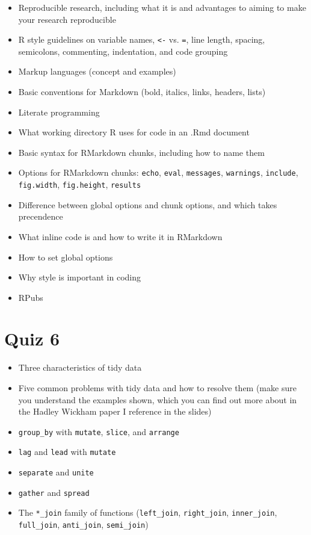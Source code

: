 \documentclass[]{book}
\providecommand{\tightlist}{%
  \setlength{\itemsep}{0pt}\setlength{\parskip}{0pt}}
\theoremstyle{definition}
\theoremstyle{definition}
\theoremstyle{definition}
\theoremstyle{remark}
\begin{document}
\begin{itemize}
\tightlist
\item
  Reproducible research, including what it is and advantages to aiming
  to make your research reproducible
\item
  R style guidelines on variable names, \texttt{\textless{}-} vs.
  \texttt{=}, line length, spacing, semicolons, commenting, indentation,
  and code grouping
\item
  Markup languages (concept and examples)
\item
  Basic conventions for Markdown (bold, italics, links, headers, lists)
\item
  Literate programming
\item
  What working directory R uses for code in an .Rmd document
\item
  Basic syntax for RMarkdown chunks, including how to name them
\item
  Options for RMarkdown chunks: \texttt{echo}, \texttt{eval},
  \texttt{messages}, \texttt{warnings}, \texttt{include},
  \texttt{fig.width}, \texttt{fig.height}, \texttt{results}
\item
  Difference between global options and chunk options, and which takes
  precendence
\item
  What inline code is and how to write it in RMarkdown
\item
  How to set global options
\item
  Why style is important in coding
\item
  RPubs
\end{itemize}

\section{Quiz 6}\label{quiz-6}

\begin{itemize}
\tightlist
\item
  Three characteristics of tidy data
\item
  Five common problems with tidy data and how to resolve them (make sure
  you understand the examples shown, which you can find out more about
  in the Hadley Wickham paper I reference in the slides)
\item
  \texttt{group\_by} with \texttt{mutate}, \texttt{slice}, and
  \texttt{arrange}
\item
  \texttt{lag} and \texttt{lead} with \texttt{mutate}
\item
  \texttt{separate} and \texttt{unite}
\item
  \texttt{gather} and \texttt{spread}
\item
  The \texttt{*\_join} family of functions (\texttt{left\_join},
  \texttt{right\_join}, \texttt{inner\_join}, \texttt{full\_join},
  \texttt{anti\_join}, \texttt{semi\_join})
\end{itemize}
\end{document}
